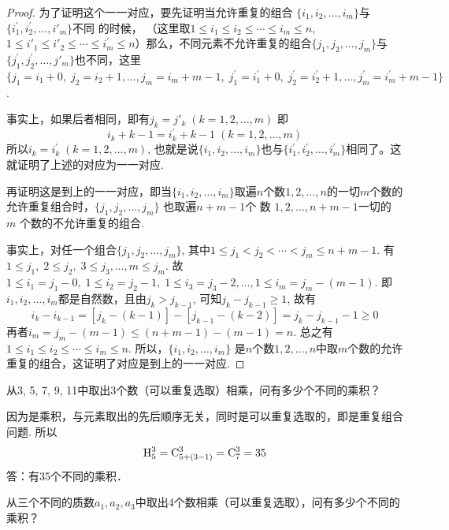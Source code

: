 \begin{proof}
    
为了证明这个一一对应，要先证明当允许重复的组合
$\{i_1,i_2,\ldots,i_m\}$与$\{i_1^{\prime},i_2^{\prime},\ldots,i'_m\}$不同 的时候，
（这里取$1\le i_1\le i_2\le\cdots\le i_m\le n$, $1\le i'_1\le i'_2\le\cdots\le i^{\prime}_m\le n$）那么，不同元素不允许重复的组合$\{j_1,j_2,\ldots, j_m\}$与$\{j_1^{\prime},j_2^{\prime},\ldots,j'_m\}$也不同，这里$\{j_1=i_1+0,\; j_2=i_{2}+1,\ldots,j_{m}=i_{m}+m-1,\; j_{1}^{\prime}=i_{1}^{\prime}+0,\; j_{2}^{\prime}=i_{2}^{\prime}+1,\ldots, j_m^{\prime}=i_m^{\prime}+m-1\}$.

事实上，如果后者相同，即有$j_{k}= j'_{k}\; (k= 1, 2, \ldots, m)$ 即
$$i_k+k-1=i_k^{\prime}+k-1\; (k=1,2,\ldots,m)$$ 
所以$i_k= i_k^{\prime }\; ( k= 1, 2, \ldots , m)$, 也就是说$\{i_1, i_2,\ldots,i_m\}$也与$\{i_1^{\prime},i_2^{\prime},\ldots,i_m^{\prime}\}$相同了。这就证明了上述的对应为一一对应.

再证明这是到上的一一对应，即当$\{i_1,i_2,\ldots,i_m\}$取遍$n$个数$1,2,\ldots,n$的一切$m$个数的允许重复组合时，$\{j_1, j_2,\ldots,j_m\}$ 也取遍$n+m-1$个 数 $1,2,\ldots ,n+m-1$一切的 $m$ 个数的不允许重复的组合.

事实上，对任一个组合$\{j_1,j_2,\ldots,j_m\}$, 其中$1\le j_{1}<j_{2}<\cdots<j_{m}\le n+m-1$. 有$1\leq j_{1},\; 2\le j_{2},\; 3\le j_{3},\ldots, m\le j_{m}$. 故$1\le i_1=j_1-0,\; 1\le i_2=j_2-1,\; 1\le i_3=j_3-2,\ldots, 1\leq i_m=j_m-(m-1)$. 即$i_1,i_2,\ldots,i_m$都是自然数，且由$j_{k}>j_{k-1}$, 可知$j_k-j_{k-1}\ge 1$, 故有
\[i_k-i_{k-1}=[j_k-(k-1)]-[j_{k-1}-(k-2)]=j_k-j_{k-1}-1\ge 0\]
再者$i_{m}=j_{m}-(m-1)\le (n+m-1)-(m-1)=n$. 总之有$1\le i_1\le i_2\le \cdots \le i_m\le n$. 所以，$\{i_1,i_2,\ldots,i_m\}$ 是$n$个数$1,2,\ldots,n$中取$m$个数的允许重复的组合，这证明了对应是到上的一一对应.

\end{proof}


\begin{example}
  从3, 5, 7, 9, 11中取出3个数（可以重复选取）相乘，问有多少个不同的乘积？  
\end{example}

\begin{solution}
    因为是乘积，与元素取出的先后顺序无关，同时是可以重复选取的，即是重复组合问题. 所以
\[{\rm H}^3_5={\rm C}^{3}_{5+(3-1)}={\rm C}^{3}_{7}=35\]
答：有35个不同的乘积．
\end{solution}

\begin{example}
    从三个不同的质数$a_1,a_2,a_3$中取出4个数相乘（可以重复选取），问有多少个不同的乘积？
\end{example}

